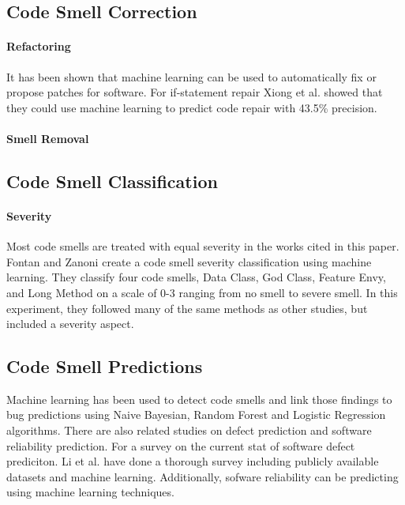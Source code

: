 \documentclass[conference]{IEEEtran}
\begin{document}
\subsection{Code Smell Correction}

\paragraph{Refactoring} It has been shown that machine learning can be used to automatically fix or propose patches for software\cite{xiong_learning_2018}. For if-statement repair Xiong et al. showed that they could use machine learning to predict code repair with 43.5\% precision.

\paragraph{Smell Removal}

\subsection{Code Smell Classification}

\paragraph{Severity} Most code smells are treated with equal severity in the works cited in this paper. Fontan and Zanoni\cite{fontana_code_2017} create a code smell severity classification using machine learning. They classify four code smells, Data Class, God Class, Feature Envy, and Long Method on a scale of 0-3 ranging from no smell to severe smell. In this experiment, they followed many of the same methods as other studies, but included a severity aspect.


\subsection{Code Smell Predictions}
Machine learning has been used to detect code smells and link those findings to bug predictions\cite{ubayawardana_bug_2018} using Naive Bayesian, Random Forest and Logistic Regression algorithms.
There are also related studies on defect prediction and software reliability prediction.
For a survey on the current stat of software defect prediciton\cite{li_progress_2018}. Li et al. have done a thorough survey including publicly available datasets and machine learning.
Additionally, sofware reliability can be predicting using machine learning techniques\cite{kulamala_predicting_2018}.
\end{document}

